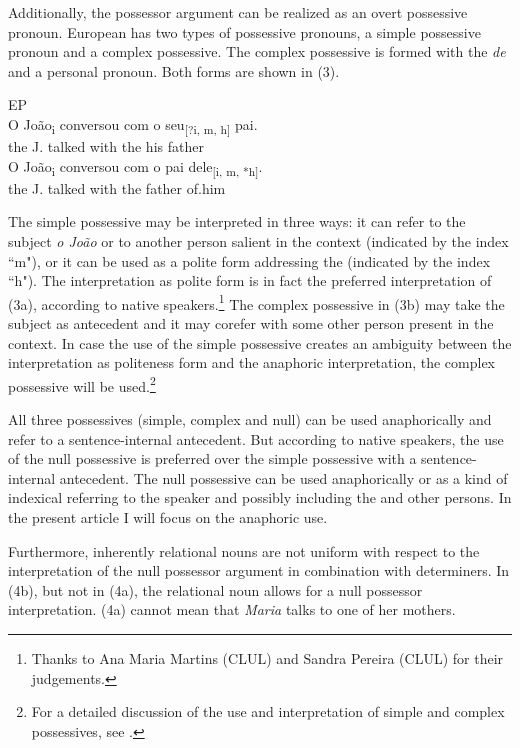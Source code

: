 \documentclass[output=paper]{langsci/langscibook}
\begin{document}
Additionally, the possessor argument can be realized as an overt possessive pronoun. European  has two types of possessive pronouns, a simple possessive pronoun and a complex possessive. The complex possessive is formed with the  \textit{de} and a personal pronoun. Both forms are shown in (3).

\ea%
    EP\label{ex:wein:3}\\
    \ea
    \gll O João\textsubscript{i} conversou com o seu\textsubscript{[?i, m, h]} pai.  \\
         the J. talked with the his father\\
    \ex
    \gll O João\textsubscript{i} conversou com o   pai   dele\textsubscript{[i, m, *h]}.\\
         the J. talked with the father of.him\\
    \z
\z

The simple possessive may be interpreted in three ways: it can refer to the subject \textit{o João} or to another person salient in the context (indicated by the index “m"), or it can be used as a polite form addressing the  (indicated by the index “h"). The interpretation as polite form is in fact the preferred interpretation of (3a), according to native speakers.\footnote{Thanks to Ana Maria Martins (CLUL) and Sandra Pereira (CLUL) for their judgements.} The complex possessive in (3b) may take the subject as antecedent and it may corefer with some other person present in the context. In case the use of the simple possessive creates an ambiguity between the interpretation as politeness form and the anaphoric interpretation, the complex possessive will be used.\footnote{For a detailed discussion of the use and interpretation of simple and complex possessives, see \citet{Castro2005}.}

All three possessives (simple, complex and null) can be used anaphorically and refer to a sentence-internal antecedent. But according to native speakers, the use of the null possessive is preferred over the simple possessive with a sentence-internal antecedent. The null possessive can be used anaphorically or as a kind of indexical referring to the speaker and possibly including the  and other persons. In the present article I will focus on the anaphoric use.

Furthermore, inherently relational nouns are not uniform with respect to the interpretation of the null possessor argument in combination with  determiners. In (4b), but not in (4a), the relational noun allows for a null possessor interpretation. (4a) cannot mean that \textit{Maria} talks to one of her mothers.
\end{document}
